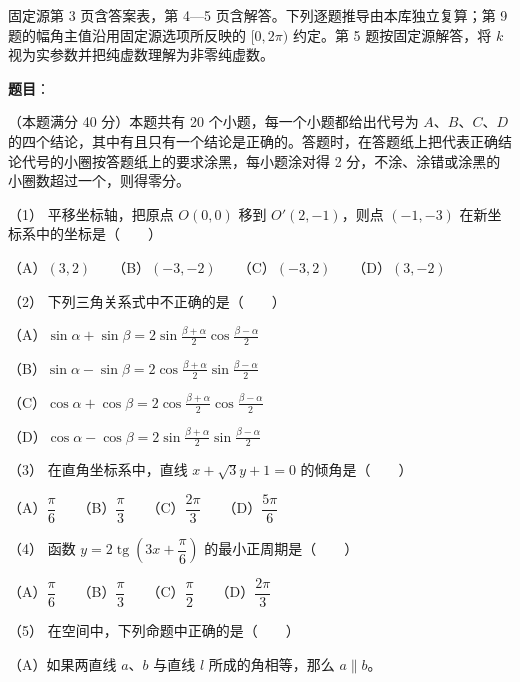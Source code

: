 

\begin{gktip}
固定源第 3 页含答案表，第 4—5 页含解答。下列逐题推导由本库独立复算；第 9 题的幅角主值沿用固定源选项所反映的 $[0,2\pi)$ 约定。第 5 题按固定源解答，将 $k$ 视为实参数并把纯虚数理解为非零纯虚数。
\end{gktip}

\begin{answer}

\textbf{题目}：

（本题满分 40 分）本题共有 20 个小题，每一个小题都给出代号为 $A\text{、}B\text{、}C\text{、}D$ 的四个结论，其中有且只有一个结论是正确的。答题时，在答题纸上把代表正确结论代号的小圈按答题纸上的要求涂黑，每小题涂对得 2 分，不涂、涂错或涂黑的小圈数超过一个，则得零分。

（1） 平移坐标轴，把原点 $O(0,0)$ 移到 $O'(2,-1)$，则点 $(-1,-3)$ 在新坐标系中的坐标是\mbox{（　　）}

（A）$(3,2)$　　（B）$(-3,-2)$　　（C）$(-3,2)$　　（D）$(3,-2)$

（2） 下列三角关系式中不正确的是\mbox{（　　）}

（A）$\sin\alpha+\sin\beta=2\sin\frac{\beta+\alpha}{2}\cos\frac{\beta-\alpha}{2}$

（B）$\sin\alpha-\sin\beta=2\cos\frac{\beta+\alpha}{2}\sin\frac{\beta-\alpha}{2}$

（C）$\cos\alpha+\cos\beta=2\cos\frac{\beta+\alpha}{2}\cos\frac{\beta-\alpha}{2}$

（D）$\cos\alpha-\cos\beta=2\sin\frac{\beta+\alpha}{2}\sin\frac{\beta-\alpha}{2}$

（3） 在直角坐标系中，直线 $x+\sqrt3y+1=0$ 的倾角是\mbox{（　　）}

（A）$\dfrac\pi6$　　（B）$\dfrac\pi3$　　（C）$\dfrac{2\pi}3$　　（D）$\dfrac{5\pi}6$

（4） 函数 $y=2\operatorname{tg}\left(3x+\dfrac\pi6\right)$ 的最小正周期是\mbox{（　　）}

（A）$\dfrac\pi6$　　（B）$\dfrac\pi3$　　（C）$\dfrac\pi2$　　（D）$\dfrac{2\pi}3$

（5） 在空间中，下列命题中正确的是\mbox{（　　）}

（A）如果两直线 $a\text{、}b$ 与直线 $l$ 所成的角相等，那么 $a\parallel b$。


\end{answer}
